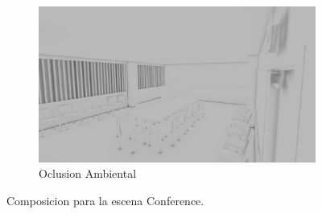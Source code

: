 \begin{figure}[H]
\begin{subfigure}[t]{.49\linewidth}
	\end{subfigure}%
	\hspace{0.01\textwidth}
	\begin{subfigure}[t]{.49\linewidth}
		\centering
		\caption*{Oclusion Ambiental}
		\captionsetup{justification=centering}
		\includegraphics[width=\linewidth]{media/finals/conf_ao.png}
	\end{subfigure}%
	\caption{Composicion para la escena Conference.}
	\label{fig:conf_final}
\end{figure}

